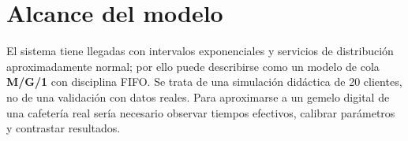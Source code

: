 \documentclass[11pt,a4paper]{article}
\begin{document}
\section{Alcance del modelo}
El sistema tiene llegadas con intervalos exponenciales y servicios de distribución aproximadamente normal; por ello puede describirse como un modelo de cola \textbf{M/G/1} con disciplina FIFO. Se trata de una simulación didáctica de 20 clientes, no de una validación con datos reales. Para aproximarse a un gemelo digital de una cafetería real sería necesario observar tiempos efectivos, calibrar parámetros y contrastar resultados.
\end{document}
